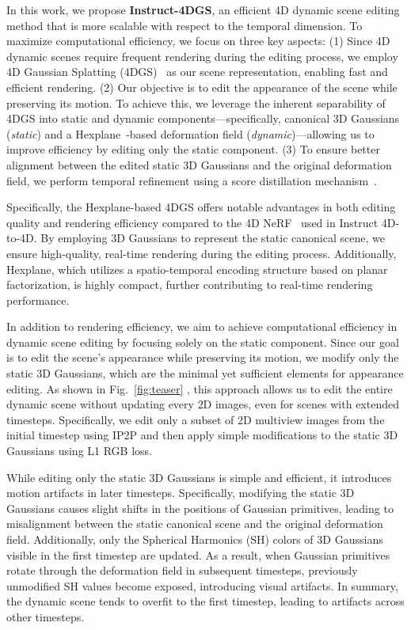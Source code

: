 In this work, we propose \textbf{Instruct-4DGS}, an efficient 4D dynamic scene editing method that is more scalable with respect to the temporal dimension. To maximize computational efficiency, we focus on three key aspects: (1) Since 4D dynamic scenes require frequent rendering during the editing process, we employ 4D Gaussian Splatting (4DGS)~\cite{ref_10_4dgs} as our scene representation, enabling fast and efficient rendering. (2) Our objective is to edit the appearance of the scene while preserving its motion. To achieve this, we leverage the inherent separability of 4DGS into static and dynamic components—specifically, canonical 3D Gaussians (\emph{static}) and a Hexplane~\cite{ref_15_kplanes, ref_16_hexplane}-based deformation field (\emph{dynamic})—allowing us to improve efficiency by editing only the static component. (3) To ensure better alignment between the edited static 3D Gaussians and the original deformation field, we perform temporal refinement using a score distillation mechanism~\cite{ref_18_dreamfusion}.

Specifically, the Hexplane-based 4DGS offers notable advantages in both editing quality and rendering efficiency compared to the 4D NeRF~\cite{ref_22_nerfplayer} used in Instruct 4D-to-4D. By employing 3D Gaussians to represent the static canonical scene, we ensure high-quality, real-time rendering during the editing process. Additionally, Hexplane, which utilizes a spatio-temporal encoding structure based on planar factorization, is highly compact, further contributing to real-time rendering performance.

In addition to rendering efficiency, we aim to achieve computational efficiency in dynamic scene editing by focusing solely on the static component. Since our goal is to edit the scene’s appearance while preserving its motion, we modify only the static 3D Gaussians, which are the minimal yet sufficient elements for appearance editing. As shown in Fig.~\ref{fig:teaser} , this approach allows us to edit the entire dynamic scene without updating every 2D images, even for scenes with extended timesteps. Specifically, we edit only a subset of 2D multiview images from the initial timestep using IP2P and then apply simple modifications to the static 3D Gaussians using L1 RGB loss.

While editing only the static 3D Gaussians is simple and efficient, it introduces motion artifacts in later timesteps. Specifically, modifying the static 3D Gaussians causes slight shifts in the positions of Gaussian primitives, leading to misalignment between the static canonical scene and the original deformation field. Additionally, only the Spherical Harmonics (SH) colors of 3D Gaussians visible in the first timestep are updated. As a result, when Gaussian primitives rotate through the deformation field in subsequent timesteps, previously unmodified SH values become exposed, introducing visual artifacts. In summary, the dynamic scene tends to overfit to the first timestep, leading to artifacts across other timesteps.

